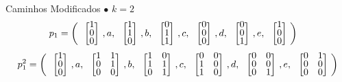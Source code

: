 \documentclass[aspectratio=169,14pt]{beamer} %
\begin{document}
\begin{frame}{Caminhos Modificados}
  \setlength\arraycolsep{2pt}
 $\bullet$ $k=2$
 \small
 \begin{align*}
  p_1&= \left(\colvec{1\\0\\0},a,\colvec{1\\1\\0},b,\colvec{0\\1\\1},c,\colvec{0\\0\\0},d,\colvec{0\\0\\1},e,\colvec{1\\0\\0}\right)
\end{align*}
 \begin{align*}
  p_1^2&= \left(\colvec{1\\0\\0},a,\colvec{1&1\\0&1\\0&0},b,\colvec{1&0\\1&1\\0&1},c,\colvec{0&0\\1&0\\1&0},d,\colvec{0&0\\0&0\\0&1},e,\colvec{0&1\\0&0\\0&0}\right) \\ 
\end{align*}
\end{frame}
\end{document}
